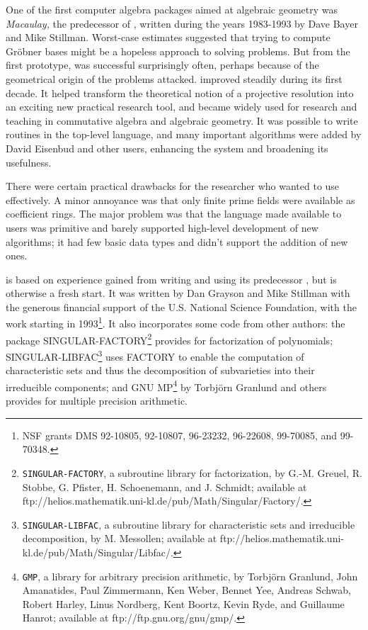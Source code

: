 One of the first computer algebra packages aimed at algebraic geometry
was {\sl Macaulay,} the predecessor of \Mtwo, written during the years
1983-1993 by Dave Bayer and Mike Stillman. Worst-case estimates
suggested that trying to compute Gr\"obner bases might be a hopeless
approach to solving problems. But from the first prototype, \Macaulay
was successful surprisingly often, perhaps because of the geometrical
origin of the problems attacked.  \Macaulay improved steadily during
its first decade.  It helped transform the theoretical notion of a
projective resolution into an exciting new practical research tool,
and became widely used for research and teaching in commutative
algebra and algebraic geometry.  It was possible to write routines in
the top-level language, and many important algorithms were added by
David Eisenbud and other users, enhancing the system and broadening its
usefulness.

There were certain practical drawbacks for the researcher who wanted to use
\Macaulay effectively.  A minor annoyance was that only finite prime fields
were available as coefficient rings.  The major problem was that the language
made available to users was primitive and barely supported high-level
development of new algorithms; it had few basic data types and didn't support
the addition of new ones. 

\Mtwo is based on experience gained from writing and using its predecessor
\Macaulay, but is otherwise a fresh start.  It was written by Dan Grayson and
Mike Stillman with the generous financial support of the U.S. National
Science Foundation, with the work starting in 1993\footnote{NSF grants DMS
  92-10805, 92-10807, 96-23232, 96-22608, 99-70085, and 99-70348.}.  
It also incorporates
some code from other authors: the package
SINGULAR-FACTORY\footnote{\texttt{SINGULAR-FACTORY},
        a subroutine library for factorization,
        by G.-M. Greuel, R. Stobbe, G. Pfister, H. Schoenemann, and J. Schmidt;
        available at ftp://helios.mathematik.uni-kl.de/pub/Math/Singular/Factory/.}
provides for factorization of polynomials; 
SINGULAR-LIBFAC\footnote{\texttt{SINGULAR-LIBFAC},
        a subroutine library for characteristic sets and irreducible decomposition,
        by M. Messollen;
        available at ftp://helios.mathematik.uni-kl.de/pub/Math/Singular/Libfac/.}
uses FACTORY to enable the computation of characteristic
sets and thus the decomposition of subvarieties into their irreducible
components; and
GNU MP\footnote{\texttt{GMP}, a library for arbitrary precision arithmetic,
        by Torbj\"orn Granlund,
        John Amanatides,
        Paul Zimmermann,
        Ken Weber,
        Bennet Yee,
        Andreas Schwab,
        Robert Harley,
        Linus Nordberg,
        Kent Boortz,
        Kevin Ryde, and
        Guillaume Hanrot;
        available at {ftp://ftp.gnu.org/gnu/gmp/}.}
by Torbj\"orn Granlund and others provides
for multiple precision arithmetic.

